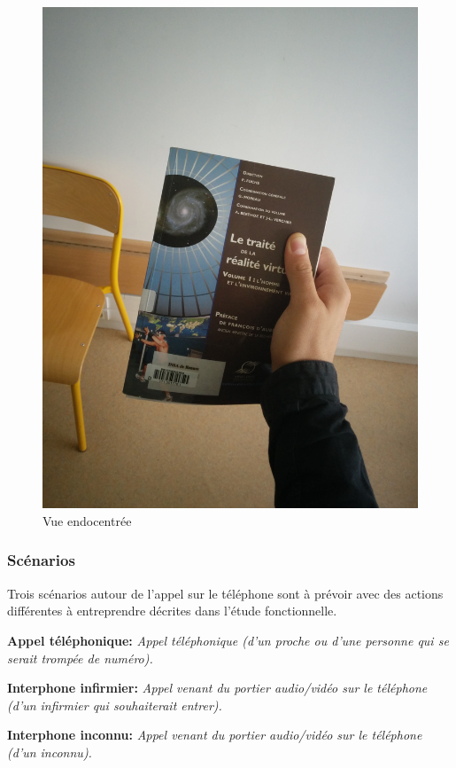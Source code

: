 \begin{figure}[h]
\begin{minipage}[b]{0.3\textwidth}
		\includegraphics[width=\linewidth]{3-Planification/img-utilisateur/vue_fps}
		\caption{Vue endocentrée}
		\label{endo}
	\end{minipage}
\end{figure}

\subsubsection{Scénarios}
Trois scénarios autour de l'appel sur le téléphone sont à prévoir avec des actions différentes à entreprendre décrites dans l'étude fonctionnelle. \newline

\textbf{Appel téléphonique: }\emph{Appel téléphonique (d'un proche ou d'une personne qui se serait trompée de numéro). }

\textbf{Interphone infirmier: } \emph{Appel venant du portier audio/vidéo sur le téléphone (d'un infirmier qui souhaiterait entrer). }

\textbf{Interphone inconnu: } \emph{Appel venant du portier audio/vidéo sur le téléphone (d'un inconnu). }
